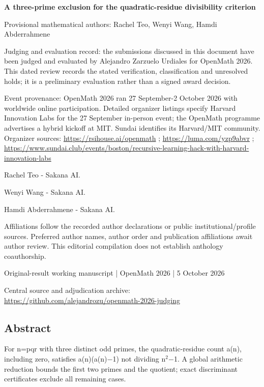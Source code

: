\documentclass[11pt,a4paper]{article}
\begin{document}
{\LARGE\bfseries A three-prime exclusion for the quadratic-residue divisibility criterion\par}\medskip
{\small Provisional mathematical authors: Rachel Teo, Wenyi Wang, Hamdi Abderrahmene\par}\medskip
{\small Judging and evaluation record: the submissions discussed in this document have been judged and evaluated by Alejandro Zarzuelo Urdiales for OpenMath 2026. This dated review records the stated verification, classification and unresolved holds; it is a preliminary evaluation rather than a signed award decision.\par}

{\small Event provenance: OpenMath 2026 ran 27 September-2 October 2026 with worldwide online participation. Detailed organizer listings specify Harvard Innovation Labs for the 27 September in-person event; the OpenMath programme advertises a hybrid kickoff at MIT. Sundai identifies its Harvard/MIT community. Organizer sources: \url{https://rsihouse.ai/openmath} ; \url{https://luma.com/yzp9abvr} ; \url{https://www.sundai.club/events/boston/recursive-learning-hack-with-harvard-innovation-labs}\par}

{\small Rachel Teo  -  Sakana AI.\par}

{\small Wenyi Wang  -  Sakana AI.\par}

{\small Hamdi Abderrahmene  -  Sakana AI.\par}

{\small Affiliations follow the recorded author declarations or public institutional/profile sources. Preferred author names, author order and publication affiliations await author review. This editorial compilation does not establish anthology coauthorship.\par}

{\small Original-result working manuscript | OpenMath 2026 | 5 October 2026\par}\medskip
{\small Central source and adjudication archive: \url{https://github.com/alejandrozu/openmath-2026-judging}\par}

\subsection{Abstract}
For n=pqr with three distinct odd primes, the quadratic-residue count a(n), including zero, satisfies a(n)(a(n)\ensuremath{-}1) not dividing n\ensuremath{^2}\ensuremath{-}1. A global arithmetic reduction bounds the first two primes and the quotient; exact discriminant certificates exclude all remaining cases.
\end{document}
